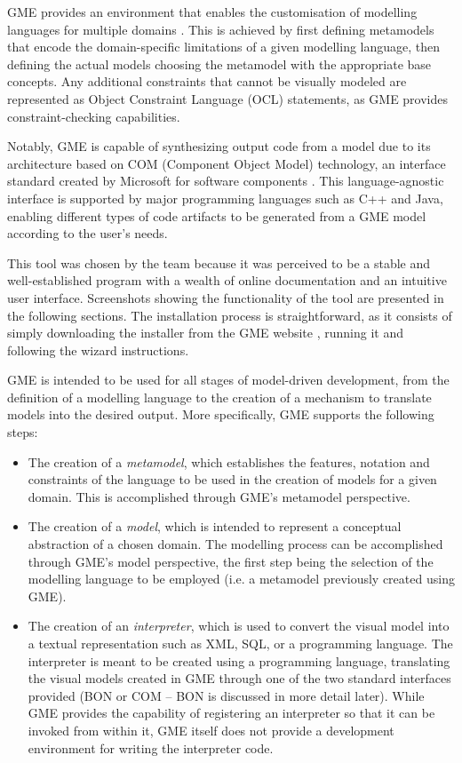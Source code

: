 \documentclass[11pt, a4paper, oneside, openright]{article}
\begin{document}
GME provides an environment that enables the customisation of modelling languages
for multiple domains \cite{gmePaper}. This is achieved by first defining metamodels that
encode the domain-specific limitations of a given modelling language, then
defining the actual models choosing the metamodel with the appropriate base
concepts. Any additional constraints that cannot be visually modeled are
represented as Object Constraint Language (OCL) statements, as GME provides
constraint-checking capabilities.

Notably, GME is capable of synthesizing output code from a model due to its
architecture based on COM (Component Object Model) technology, an interface
standard created by Microsoft for software components \cite{gmeJava}. This
language-agnostic interface is supported by major programming languages such as
C++ and Java, enabling different types of code artifacts to be generated from a
GME model according to the user’s needs.

This tool was chosen by the team because it was perceived to be a stable and
well-established program with a wealth of online documentation and an intuitive
user interface. Screenshots showing the functionality of the tool are presented
in the following sections. The installation process is straightforward, as it
consists of simply downloading the installer from the GME website \cite{gmeSite}, running
it and following the wizard instructions.

GME is intended to be used for all stages of model-driven development, from the
definition of a modelling language to the creation of a mechanism to translate
models into the desired output. More specifically, GME supports the following
steps:

\begin{itemize}
  \item The creation of a \textit{metamodel}, which establishes the features,
  notation and constraints of the language to be used in the creation of models
  for a given domain. This is accomplished through GME's metamodel perspective.
  \item The creation of a \textit{model}, which is intended to represent a
  conceptual abstraction of a chosen domain. The modelling process can be
  accomplished through GME's model perspective, the first step being the
  selection of the modelling language to be employed (i.e. a metamodel
  previously created using GME).
  \item The creation of an \textit{interpreter}, which is used to convert the
  visual model into a textual representation such as XML, SQL, or a programming
  language. The interpreter is meant to be created using a programming language,
  translating the visual models created in GME through one of the two standard
  interfaces provided (BON or COM -- BON is discussed in more detail later). While GME
  provides the capability of registering an interpreter so that it can be
  invoked from within it, GME itself does not provide a development environment
  for writing the interpreter code.
\end{itemize}
\end{document}
